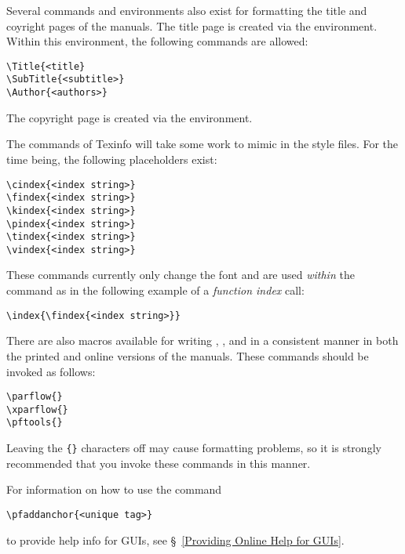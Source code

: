 Several commands and environments also exist for formatting the title
and coyright pages of the manuals.
The title page is created via the  environment.
Within this environment, the following commands are allowed:
\begin{display}\begin{verbatim}
\Title{<title}
\SubTitle{<subtitle>}
\Author{<authors>}
\end{verbatim}\end{display}
The copyright page is created via the  environment.

The  commands of Texinfo will take some work to mimic in
the \parflow{} style files.
For the time being, the following placeholders exist:
\begin{display}\begin{verbatim}
\cindex{<index string>}
\findex{<index string>}
\kindex{<index string>}
\pindex{<index string>}
\tindex{<index string>}
\vindex{<index string>}
\end{verbatim}\end{display}
These commands currently only change the font and are used {\em within}
the  command as in the following example of a
{\em function index} call:
\begin{display}\begin{verbatim}
\index{\findex{<index string>}}
\end{verbatim}\end{display}

There are also macros available for writing \parflow{}, \xparflow{},
and \pftools{} in a consistent manner in both the printed and online
versions of the manuals.
These commands should be invoked as follows:
\begin{display}\begin{verbatim}
\parflow{}
\xparflow{}
\pftools{}
\end{verbatim}\end{display}
Leaving the \verb#{}# characters off may cause formatting problems,
so it is strongly recommended that you invoke these commands in this
manner.

For information on how to use the command
\begin{display}\begin{verbatim}
\pfaddanchor{<unique tag>}
\end{verbatim}\end{display}
to provide help info for \parflow{} GUIs,
see \S~\ref{Providing Online Help for GUIs}.

